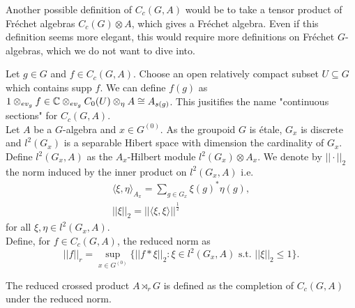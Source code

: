 \begin{rk}
Another possible definition of $C_c(G,A)$ would be to take a tensor product of Fréchet algebras $C_c(G)\otimes A$, which gives a Fréchet algebra. Even if this definition seems more elegant, this would require more definitions on Fréchet $G$-algebras, which we do not want to dive into.  
\end{rk}



Let $g\in G$ and $f\in C_c(G,A)$. Choose an open relatively compact subset $U\subseteq G$ which contains supp $f$. We can define $f(g)$ as $1\otimes_{ev_g} f \in \mathbb C \otimes_{ev_g} C_0(U)\otimes_\eta A\cong A_{s(g)}$. This jusitifies the name "continuous sections" for $C_c(G,A)$. \\

Let $A$ be a $G$-algebra and $x\in G^{(0)}$. As the groupoid $G$ is étale, $G_x$ is discrete and $l^2(G_x)$ is a separable Hibert space with dimension the cardinality of $G_x$. Define $l^2(G_x,A)$ as the $A_x$-Hilbert module $l^2(G_x)\otimes A_x$. We denote by $||\cdot||_2$ the norm induced by the inner product on $l^2(G_x,A)$ i.e. 
\[ \begin{array}{c}
\langle \xi,\eta\rangle_{A_x}= \sum_{g\in G_x} \xi(g)^* \eta(g),\\
||\xi||_2= ||\langle \xi,\xi \rangle||^\frac{1}{2} 
\end{array}\] 
for all $\xi,\eta\in l^2(G_x,A)$.\\

Define, for $f\in C_c(G,A)$, the reduced norm as 
\[||f||_r= \sup_{x\in G^{(0)}}\{ ||f\ast \xi||_2 : \xi\in l^2(G_x,A) \text{ s.t. } ||\xi||_2\leq 1\}.\]


\begin{definition}
The reduced crossed product $A\rtimes_r G$ is defined as the completion of $C_c(G,A)$ under the reduced norm.
\end{definition}

